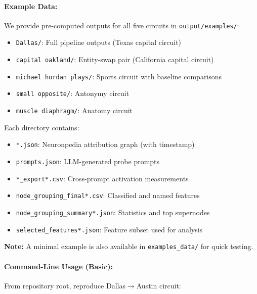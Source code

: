 \paragraph{Example Data:}
We provide pre-computed outputs for all five circuits in \texttt{output/examples/}:
\begin{itemize}
  \item \texttt{Dallas/}: Full pipeline outputs (Texas capital circuit)
  \item \texttt{capital oakland/}: Entity-swap pair (California capital circuit)
  \item \texttt{michael hordan plays/}: Sports circuit with baseline comparisons
  \item \texttt{small opposite/}: Antonymy circuit
  \item \texttt{muscle diaphragm/}: Anatomy circuit
\end{itemize}

Each directory contains:
\begin{itemize}
  \item \texttt{*.json}: Neuronpedia attribution graph (with timestamp)
  \item \texttt{prompts.json}: LLM-generated probe prompts
  \item \texttt{*\_export*.csv}: Cross-prompt activation measurements
  \item \texttt{node\_grouping\_final*.csv}: Classified and named features
  \item \texttt{node\_grouping\_summary*.json}: Statistics and top supernodes
  \item \texttt{selected\_features*.json}: Feature subset used for analysis
\end{itemize}

\textbf{Note:} A minimal example is also available in \texttt{examples\_data/} for quick testing.

\paragraph{Command-Line Usage (Basic):}
From repository root, reproduce Dallas$\rightarrow$Austin circuit:

